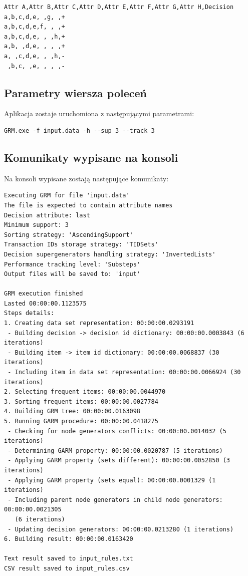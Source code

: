 \documentclass[a4paper,10pt]{article}
\begin{document}
\begin{verbatim}
Attr A,Attr B,Attr C,Attr D,Attr E,Attr F,Attr G,Attr H,Decision
a,b,c,d,e, ,g, ,+
a,b,c,d,e,f, , ,+
a,b,c,d,e, , ,h,+
a,b, ,d,e, , , ,+
a, ,c,d,e, , ,h,-
 ,b,c, ,e, , , ,-
\end{verbatim}


 \subsection{Parametry wiersza poleceń}
 Aplikacja zostaje uruchomiona z następującymi parametrami:
 
\begin{verbatim}
GRM.exe -f input.data -h --sup 3 --track 3
\end{verbatim}


 \subsection{Komunikaty wypisane na konsoli}
 Na konsoli wypisane zostają następujące komunikaty:
 
\begin{verbatim}
Executing GRM for file 'input.data'
The file is expected to contain attribute names
Decision attribute: last
Minimum support: 3
Sorting strategy: 'AscendingSupport'
Transaction IDs storage strategy: 'TIDSets'
Decision supergenerators handling strategy: 'InvertedLists'
Performance tracking level: 'Substeps'
Output files will be saved to: 'input'

GRM execution finished
Lasted 00:00:00.1123575
Steps details:
1. Creating data set representation: 00:00:00.0293191
 - Building decision -> decision id dictionary: 00:00:00.0003843 (6 iterations)
 - Building item -> item id dictionary: 00:00:00.0068837 (30 iterations)
 - Including item in data set representation: 00:00:00.0066924 (30 iterations)
2. Selecting frequent items: 00:00:00.0044970
3. Sorting frequent items: 00:00:00.0027784
4. Building GRM tree: 00:00:00.0163098
5. Running GARM procedure: 00:00:00.0418275
 - Checking for node generators conflicts: 00:00:00.0014032 (5 iterations)
 - Determining GARM property: 00:00:00.0020787 (5 iterations)
 - Applying GARM property (sets different): 00:00:00.0052850 (3 iterations)
 - Applying GARM property (sets equal): 00:00:00.0001329 (1 iterations)
 - Including parent node generators in child node generators: 00:00:00.0021305
   (6 iterations)
 - Updating decision generators: 00:00:00.0213280 (1 iterations)
6. Building result: 00:00:00.0163420

Text result saved to input_rules.txt
CSV result saved to input_rules.csv
\end{verbatim}
\end{document}
